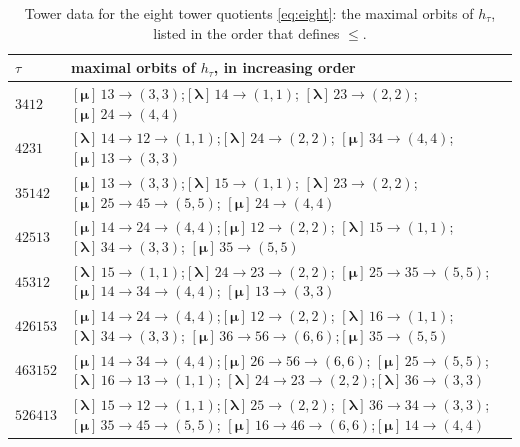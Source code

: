\documentclass[12pt]{article}
\theoremstyle{definition}
\newcommand{\blam}{\boldsymbol{\lambda}}   %
\newcommand{\bmu}{\boldsymbol{\mu}}        %
\begin{document}
\begin{table}[!htbp]
\centering
\renewcommand{\arraystretch}{1.25}
\begin{tabular}{@{}l@{\qquad}>{\raggedright\arraybackslash}p{}@{}}
\hline
$\tau$ & maximal orbits of $h_\tau$, in increasing order\\
\hline
$3412$ &
$[\bmu]\,13\to(3,3)$;\quad $[\blam]\,14\to(1,1)$;\quad
$[\blam]\,23\to(2,2)$;\quad $[\bmu]\,24\to(4,4)$\\
$4231$ &
$[\blam]\,14\to12\to(1,1)$;\quad $[\blam]\,24\to(2,2)$;\quad
$[\bmu]\,34\to(4,4)$;\quad $[\bmu]\,13\to(3,3)$\\
$35142$ &
$[\bmu]\,13\to(3,3)$;\quad $[\blam]\,15\to(1,1)$;\quad
$[\blam]\,23\to(2,2)$;\quad $[\bmu]\,25\to45\to(5,5)$;\quad
$[\bmu]\,24\to(4,4)$\\
$42513$ &
$[\bmu]\,14\to24\to(4,4)$;\quad $[\bmu]\,12\to(2,2)$;\quad
$[\blam]\,15\to(1,1)$;\quad $[\blam]\,34\to(3,3)$;\quad
$[\bmu]\,35\to(5,5)$\\
$45312$ &
$[\blam]\,15\to(1,1)$;\quad $[\blam]\,24\to23\to(2,2)$;\quad
$[\bmu]\,25\to35\to(5,5)$;\quad $[\bmu]\,14\to34\to(4,4)$;\quad
$[\bmu]\,13\to(3,3)$\\
$426153$ &
$[\bmu]\,14\to24\to(4,4)$;\quad $[\bmu]\,12\to(2,2)$;\quad
$[\blam]\,16\to(1,1)$;\quad $[\blam]\,34\to(3,3)$;\quad
$[\bmu]\,36\to56\to(6,6)$;\quad $[\bmu]\,35\to(5,5)$\\
$463152$ &
$[\bmu]\,14\to34\to(4,4)$;\quad $[\bmu]\,26\to56\to(6,6)$;\quad
$[\bmu]\,25\to(5,5)$;\quad $[\blam]\,16\to13\to(1,1)$;\quad
$[\blam]\,24\to23\to(2,2)$;\quad $[\blam]\,36\to(3,3)$\\
$526413$ &
$[\blam]\,15\to12\to(1,1)$;\quad $[\blam]\,25\to(2,2)$;\quad
$[\blam]\,36\to34\to(3,3)$;\quad $[\bmu]\,35\to45\to(5,5)$;\quad
$[\bmu]\,16\to46\to(6,6)$;\quad $[\bmu]\,14\to(4,4)$\\
\hline
\end{tabular}
\caption{Tower data for the eight tower quotients \eqref{eq:eight}: the
maximal orbits of $h_\tau$, listed in the order that defines $\le$.}
\label{tab:certs}
\end{table}
\end{document}
